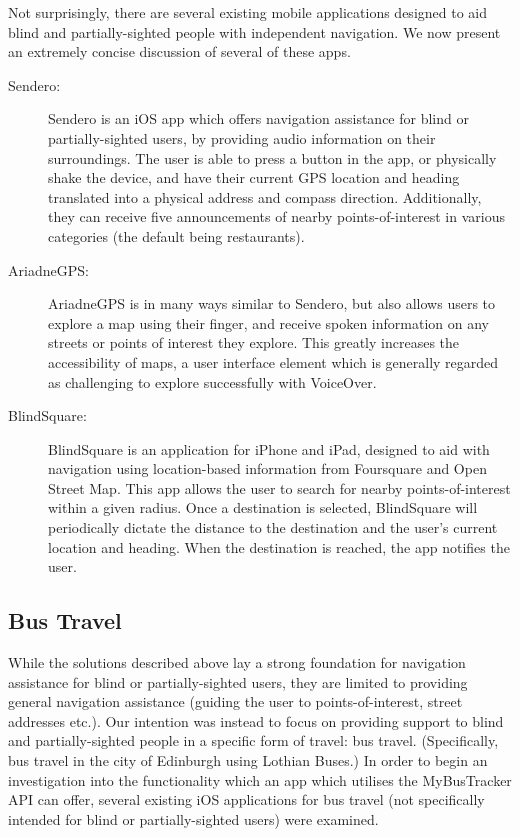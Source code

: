 \documentclass[10pt,twocolumn]{article}
\newcommand{\citep}[1]{}
\begin{document}
Not surprisingly, there are several existing mobile applications designed to aid blind and partially-sighted people with independent navigation. We now present an extremely concise discussion of several of these apps.
\begin{description}
\item[Sendero:]
Sendero is an iOS app which offers navigation assistance for blind or partially-sighted users, by providing audio information on their surroundings\citep{sendero}. The user is able to  press a button in the app, or physically shake the device, and have their current GPS location and heading translated into a physical address and compass direction\citep{senderoSupport}. Additionally, they can receive five announcements of nearby points-of-interest in various categories (the default being restaurants).

\item[AriadneGPS:]
AriadneGPS is in many ways similar to Sendero, but also allows users to explore a map using their finger, and receive spoken information on any streets or points of interest they explore\citep{ariadneGPS}.  This greatly increases the accessibility of maps, a user interface element which is generally regarded as challenging to explore successfully with VoiceOver.

\item[BlindSquare:]
BlindSquare is an application for iPhone and iPad, designed to aid with navigation using location-based information from Foursquare and Open Street Map\citep{blindsquare}. This app allows the user to search for nearby points-of-interest within a given radius. Once a destination is selected, BlindSquare will periodically dictate the distance to the destination and the user's current location and heading. When the destination is reached, the app notifies the user.
\end{description}


\subsection{Bus Travel}
While the solutions described above lay a strong foundation for navigation assistance for blind or partially-sighted users, they are limited to providing general navigation assistance (guiding the user to points-of-interest, street addresses etc.). Our intention was instead to focus on providing support to blind and partially-sighted people in a specific form of travel: bus travel.  (Specifically, bus travel in the city of Edinburgh using Lothian Buses.)
In order to begin an investigation into the functionality which an app which utilises the MyBusTracker API can offer, several existing iOS applications for bus travel (not specifically intended for blind or partially-sighted users) were examined.
\end{document}
